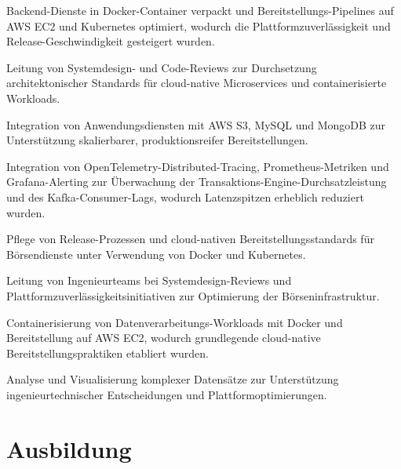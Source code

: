 \documentclass[10pt,a4paper]{resume}
\begin{document}
\bullets
  \item Backend-Dienste in Docker-Container verpackt und Bereitstellungs-Pipelines auf AWS EC2 und Kubernetes optimiert, wodurch die Plattformzuverlässigkeit und Release-Geschwindigkeit gesteigert wurden.
  \item Leitung von Systemdesign- und Code-Reviews zur Durchsetzung architektonischer Standards für cloud-native Microservices und containerisierte Workloads.
  \item Integration von Anwendungsdiensten mit AWS S3, MySQL und MongoDB zur Unterstützung skalierbarer, produktionsreifer Bereitstellungen.
\bulletsend
\vspace{1.5pt}
\bullets
  \item Integration von OpenTelemetry-Distributed-Tracing, Prometheus-Metriken und Grafana-Alerting zur Überwachung der Transaktions-Engine-Durchsatzleistung und des Kafka-Consumer-Lags, wodurch Latenzspitzen erheblich reduziert wurden.
  \item Pflege von Release-Prozessen und cloud-nativen Bereitstellungsstandards für Börsendienste unter Verwendung von Docker und Kubernetes.
  \item Leitung von Ingenieurteams bei Systemdesign-Reviews und Plattformzuverlässigkeitsinitiativen zur Optimierung der Börseninfrastruktur.
\bulletsend
\vspace{1.5pt}
\bullets
  \item Containerisierung von Datenverarbeitungs-Workloads mit Docker und Bereitstellung auf AWS EC2, wodurch grundlegende cloud-native Bereitstellungspraktiken etabliert wurden.
  \item Analyse und Visualisierung komplexer Datensätze zur Unterstützung ingenieurtechnischer Entscheidungen und Plattformoptimierungen.
\bulletsend
\vspace{1.5pt}

\section{Ausbildung}

\vspace{2pt}
\end{document}
